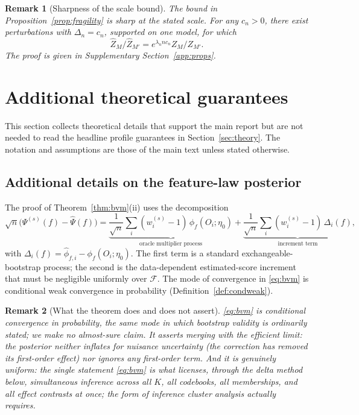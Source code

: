 \documentclass[11pt]{article}
\newtheorem{remark}{Remark}
\newcommand{\calF}{\mathcal F}
\newcommand{\hPsi}{\widehat\Psi}
\newcommand{\hphi}{\widehat\phi}
\begin{document}
\begin{remark}[Sharpness of the scale bound]\label{rem:energy_sharp}
The bound in Proposition~\ref{prop:fragility} is sharp at the stated scale.  For any $c_n>0$, there exist perturbations with $\Delta_n=c_n$, supported on one model, for which
\[
\widehat Z_M/\widehat Z_{M'}
=
e^{\lambda_n n c_n}Z_M/Z_{M'}.
\]
The proof is given in Supplementary Section~\ref{app:props}.
\end{remark}

\section{Additional theoretical guarantees}\label{sec:app:additional_theory}

This section collects theoretical details that support the main report but are not needed to read the headline profile guarantees in Section~\ref{sec:theory}.  The notation and assumptions are those of the main text unless stated otherwise.

\subsection{Additional details on the feature-law posterior}\label{sec:app:bvm_details}

The proof of Theorem~\ref{thm:bvm}\textup{(ii)} uses the decomposition
\begin{equation}\label{eq:bvmdecomp}
\sqrt n\bigl(\Psi^{(s)}(f)-\hPsi(f)\bigr)
=\underbrace{\frac1{\sqrt n}\sum_i(w_i^{(s)}-1)\,\phi_f(O_i;\eta_0)}_{\text{oracle multiplier process}}
+\underbrace{\frac1{\sqrt n}\sum_i(w_i^{(s)}-1)\,\Delta_i(f)}_{\text{increment term}},
\end{equation}
with $\Delta_i(f)=\hphi_{f,i}-\phi_f(O_i;\eta_0)$.
The first term is a standard exchangeable-bootstrap process; the second is the data-dependent estimated-score increment that must be negligible uniformly over $\calF$. The mode of convergence in \eqref{eq:bvm} is conditional weak convergence in probability (Definition~\ref{def:condweak}).

\begin{remark}[What the theorem does and does not assert]\label{rem:bvmscope}
\eqref{eq:bvm} is conditional convergence in probability, the same mode in which bootstrap validity is ordinarily stated; we make no almost-sure claim. It asserts merging with the efficient limit: the posterior neither inflates for nuisance uncertainty (the correction has removed its first-order effect) nor ignores any first-order term. And it is genuinely uniform: the single statement \eqref{eq:bvm} is what licenses, through the delta method below, simultaneous inference across all $K$, all codebooks, all memberships, and all effect contrasts at once; the form of inference cluster analysis actually requires.
\end{remark}
\end{document}
